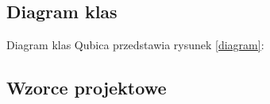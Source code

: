 \documentclass[12pt]{report}
\begin{document}
\subsection{Diagram klas}

Diagram klas Qubica przedstawia rysunek \ref{diagram}:

\newpage
\noindent
\begin{minipage}{\linewidth}
\label{diagram}
\end{minipage}

\subsection{Wzorce projektowe}
\end{document}
